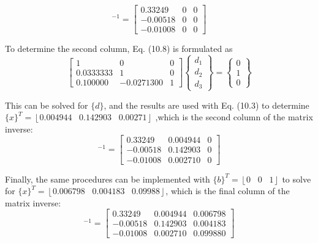 \documentclass[../main.tex]{subfiles}
\begin{document}
\begin{equation}
[A]^{-1}=\begin{bmatrix}
0.33249 & 0 &0 \\ 
-0.00518 & 0 & 0\\ 
-0.01008 & 0 & 0
\end{bmatrix}
\end{equation}

To determine the second column, Eq. (10.8) is formulated as
\begin{equation}
\begin{bmatrix}
1& 0& 0\\
0.0333333& 1& 0\\
0.100000& -0.0271300& 1
\end{bmatrix}
\begin{Bmatrix}
d_{1}\\ 
d_{2}\\ 
d_{3}
\end{Bmatrix}
=
\begin{Bmatrix}
0\\
1\\
0
\end{Bmatrix}
\end{equation}

This can be solved for $\{d\}$, and the results are used with Eq. (10.3) to determine 
$\{x\}^{T}=\left \lfloor 0.004944\;\;\; 0.142903\;\;\; 0.00271 \right \rfloor$
,which is the second column of the matrix inverse:
\begin{equation}
[A]^{-1}=
\begin{bmatrix}
0.33249& 0.004944& 0\\
-0.00518& 0.142903& 0\\
-0.01008& 0.002710& 0
\end{bmatrix}
\end{equation}

Finally, the same procedures can be implemented with $\{b\}^{T}=\left \lfloor 0\;\;\; 0\;\;\; 1 \right \rfloor$ to solve for
$\{x\}^{T}=\left \lfloor 0.006798\;\;\; 0.004183\;\;\; 0.09988 \right \rfloor$, which is the final column of the matrix inverse:
\begin{equation}
[A]^{-1}=
\begin{bmatrix}
0.33249& 0.004944& 0.006798\\
-0.00518& 0.142903& 0.004183\\
-0.01008& 0.002710& 0.099880
\end{bmatrix}
\end{equation}
\end{document}
